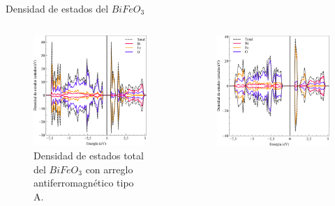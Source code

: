 \begin{frame}{Densidad de estados del $BiFeO_{3}$}
\begin{columns}[t]
    \begin{figure}[H]
        \centering
        \includegraphics[width=1.0\textwidth]{contenido/resultados/img_resultados/BFO_DOS_A.png}
        \caption{Densidad de estados total del $BiFeO_{3}$ con arreglo         
            antiferromagn\'etico tipo A.}
    \end{figure}
    \begin{figure}[H]
        \centering
        \includegraphics[width=1.0\textwidth]{contenido/resultados/img_resultados/BFO_DOS_G.png}

\end{figure}
\end{columns}
\end{frame}
